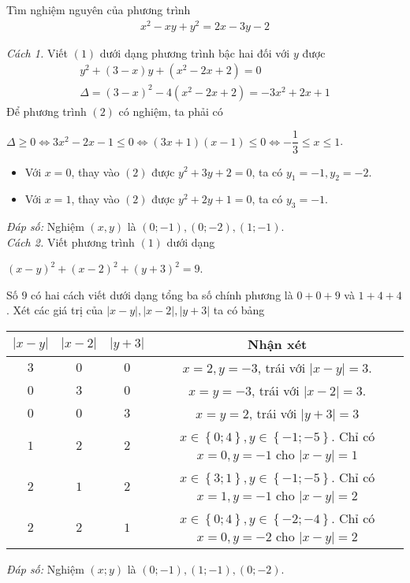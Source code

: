 \begin{vd}
    Tìm nghiệm nguyên của phương trình 
    \begin{align}
    x^2-xy+y^2=2x-3y-2\tag {1}
    \end{align}
    \loigiai
    {
    \textit{Cách 1.} Viết $(1)$ dưới dạng phương trình bậc hai đối với $y$ được
\begin{align}
y^2+(3-x)y+(x^2-2x+2)=0\tag {2}\\
\Delta = (3-x)^2-4(x^2-2x+2)=-3x^2+2x+1\nonumber
\end{align}
    Để phương trình $(2)$ có nghiệm, ta phải có
\begin{center}
    $\Delta \ge 0\Leftrightarrow 3x^2-2x-1\le 0\Leftrightarrow (3x+1)(x-1)\le 0\Leftrightarrow -\dfrac{1}{3}\le x\le 1$.
    \end{center}
    \begin{itemize}
    \item Với $x=0$, thay vào $(2)$ được $y^2+3y+2=0$, ta có $y_1=-1,y_2=-2$.
    \item Với $x=1$, thay vào $(2)$ được $y^2+2y+1=0$, ta có $y_3=-1$.
\end{itemize}
\textit{Đáp số: } Nghiệm $(x,y)$ là $(0;-1),(0;-2),(1;-1)$.\\
    \textit{Cách 2.} Viết phương trình $(1)$ dưới dạng
    \begin{center}
    $(x-y)^2+(x-2)^2+(y+3)^2=9$.
    \end{center}
    Số $9$ có hai cách viết dưới dạng tổng ba số chính phương là $0+0+9$ và $1+4+4$. Xét các giá trị của $\left|x-y\right|,\left|x-2\right|,\left|y+3\right|$ ta có bảng
    \begin{center}
    \begin{tabular}{|c|c|c|c|}
                 \hline 
                 $\left|x-y\right|$ & $\left|x-2\right|$ &  $\left|y+3\right|$&Nhận xét \\ 
                 \hline
                 $3$ & $0$ & $0$ & $x=2,y=-3$, trái với  $\left|x-y\right|=3$. \\ 
                 \hline 
                 $0$ & $3$ & $0$ & $x=y=-3$, trái với  $\left|x-2\right|=3$. \\ 
                 \hline 
                 $0$& $0$ & $3$ & $x=y=2$, trái với  $\left|y+3\right|=3$\\ 
                 \hline 
                 $1$ & $2$ & $2$ & $x\in\left\{0;4\right\},y\in\left\{-1;-5\right\}$. Chỉ có $x=0,y=-1$ cho $\left|x-y\right|=1$ \\ 
                 \hline 
                 $2$ & $1$ & $2$ & $x\in\left\{3;1\right\},y\in\left\{-1;-5\right\}$. Chỉ có $x=1,y=-1$ cho $\left|x-y\right|=2$ \\ 
                 \hline 
                $2$ & $2$ & $1$ & $x\in\left\{0;4\right\},y\in\left\{-2;-4\right\}$. Chỉ có $x=0,y=-2$ cho $\left|x-y\right|=2$ \\ 
                 \hline 
                 \end{tabular}            
    \end{center}
    \textit{Đáp số: } Nghiệm $(x;y)$ là $(0;-1),(1;-1),(0;-2)$.              
    }
\end{vd}
